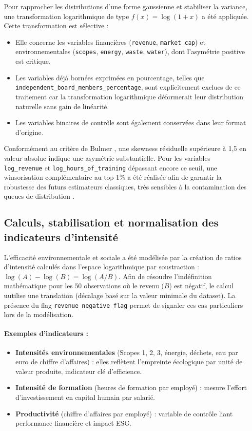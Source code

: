 Pour rapprocher les distributions d'une forme gaussienne et stabiliser la variance, une transformation logarithmique de type $f(x) = \log(1+x)$ a été appliquée. Cette transformation est sélective :
\begin{itemize}
    \item Elle concerne les variables financières (\texttt{revenue}, \texttt{market\_cap}) et environnementales (\texttt{scopes}, \texttt{energy}, \texttt{waste}, \texttt{water}), dont l'asymétrie positive est critique.
    \item Les variables déjà bornées exprimées en pourcentage, telles que \texttt{independent\_board\_members\_percentage}, sont explicitement exclues de ce traitement car la transformation logarithmique déformerait leur distribution naturelle sans gain de linéarité. 
    \item Les variables binaires de contrôle sont également conservées dans leur format d'origine.
\end{itemize}

Conformément au critère de Bulmer \cite{bulmer1979}, une skewness résiduelle supérieure à 1,5 en valeur absolue indique une asymétrie substantielle. Pour les variables \texttt{log\_revenue} et \texttt{log\_hours\_of\_training} dépassant encore ce seuil, une winsorisation complémentaire au top 1\% a été réalisée afin de garantir la robustesse des futurs estimateurs classiques, très sensibles à la contamination des queues de distribution \cite{maronna2006}.

\subsection{Calculs, stabilisation et normalisation des indicateurs d’intensité}

L’efficacité environnementale et sociale a été modélisée par la création de ratios d'intensité calculés dans l'espace logarithmique par soustraction : $\log(A) - \log(B) = \log(A/B)$. Afin de résoudre l'indéfinition mathématique pour les 50 observations où le revenu ($B$) est négatif, le calcul uutilise une translation (décalage basé sur la valeur minimale du dataset). La présence du flag \texttt{revenue\_negative\_flag} permet de signaler ces cas particuliers lors de la modélisation.
\paragraph{Exemples d’indicateurs :}
\begin{itemize}
    \item \textbf{Intensités environnementales} (Scopes 1, 2, 3, énergie, déchets, eau par euro de chiffre d’affaires) : elles reflètent l’empreinte écologique par unité de valeur produite, indicateur clé d’efficience.
    \item \textbf{Intensité de formation} (heures de formation par employé) : mesure l’effort d’investissement en capital humain par salarié.
    \item \textbf{Productivité} (chiffre d’affaires par employé) : variable de contrôle liant performance financière et impact ESG.
\end{itemize}

